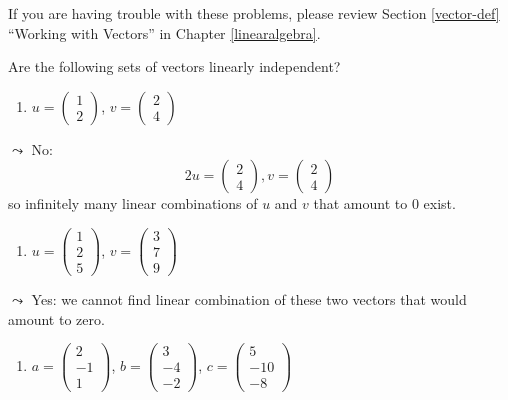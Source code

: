 \documentclass[]{book}
\providecommand{\tightlist}{%
  \setlength{\itemsep}{0pt}\setlength{\parskip}{0pt}}
\theoremstyle{definition}
\theoremstyle{definition}
\theoremstyle{definition}
\theoremstyle{remark}
\begin{document}
If you are having trouble with these problems, please review Section
\ref{vector-def} ``Working with Vectors'' in Chapter
\ref{linearalgebra}.

Are the following sets of vectors linearly independent?

\begin{enumerate}
\def\labelenumi{\arabic{enumi}.}
\tightlist
\item
  \(u = \begin{pmatrix} 1\\ 2\end{pmatrix}\),
  \(v = \begin{pmatrix} 2\\4\end{pmatrix}\)
\end{enumerate}

\(\leadsto\) No:
\[2u = \begin{pmatrix} 2\\ 4\end{pmatrix}, v = \begin{pmatrix} 2\\ 4\end{pmatrix}\]
so infinitely many linear combinations of \(u\) and \(v\) that amount to
0 exist.

\begin{enumerate}
\def\labelenumi{\arabic{enumi}.}
\setcounter{enumi}{1}
\tightlist
\item
  \(u = \begin{pmatrix} 1\\ 2\\ 5 \end{pmatrix}\),
  \(v = \begin{pmatrix} 3\\ 7\\ 9 \end{pmatrix}\)
\end{enumerate}

\(\leadsto\) Yes: we cannot find linear combination of these two vectors
that would amount to zero.

\begin{enumerate}
\def\labelenumi{\arabic{enumi}.}
\setcounter{enumi}{2}
\tightlist
\item
  \(a = \begin{pmatrix} 2\\ -1\\ 1 \end{pmatrix}\),
  \(b = \begin{pmatrix} 3\\ -4\\ -2 \end{pmatrix}\),
  \(c = \begin{pmatrix} 5\\ -10\\ -8 \end{pmatrix}\)
\end{enumerate}
\end{document}
